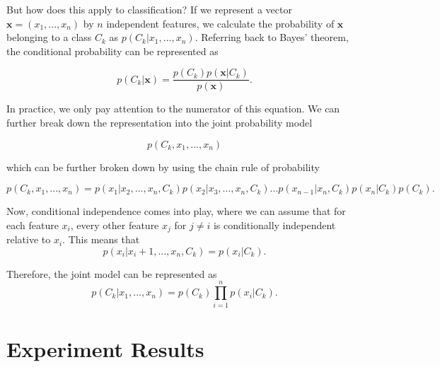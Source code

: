 \documentclass[11pt, letterpaper]{article}
\renewcommand{\vec}[1]{\mathbf{#1}}
\begin{document}
But how does this apply to classification? If we represent a vector $\vec{x} = (x_1,...,x_n)$ by $n$ independent features, we calculate the probability of $\vec{x}$ belonging to a class $C_k$ as $p(C_k | x_1,...,x_n)$. Referring back to Bayes' theorem, the conditional probability can be represented as

$$p(C_k | \vec{x}) = \frac{p(C_k)p(\vec{x} | C_k)}{p(\vec{x})}.$$

In practice, we only pay attention to the numerator of this equation. We can further break down the representation into the joint probability model

$$p(C_k, x_1,...,x_n)$$

which can be further broken down by using the chain rule of probability


$$p(C_k, x_1,..., x_n) = p(x_1 | x_2,...,x_n, C_k)p(x_2 | x_3,...,x_n, C_k)...p(x_{n-1} | x_n, C_k)p(x_n | C_k)p(C_k).$$ 

Now, conditional independence comes into play, where we can assume that for each feature $x_i$, every other feature $x_j$ for $j \neq i$ is conditionally independent relative to $x_i$. This means that 
$$p(x_i | x_i+1,...,x_n, C_k) = p(x_i | C_k).$$

Therefore, the joint model can be represented as $$p(C_k | x_1,...,x_n) = p(C_k) \prod_{i=1}^{n}p(x_i | C_k).$$

\section{Experiment Results}
\end{document}
